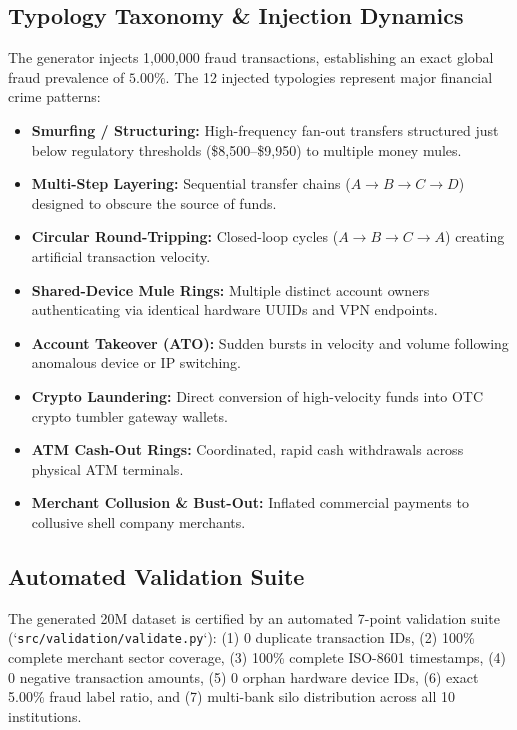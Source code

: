 \subsection{Typology Taxonomy \&  Injection Dynamics}
The generator injects 1,000,000 fraud transactions, establishing an exact global fraud prevalence of $5.00\%$. The 12 injected typologies represent major financial crime patterns:
\begin{itemize}
    \item \textbf{Smurfing / Structuring:} High-frequency fan-out transfers structured just below regulatory thresholds (\$8,500--\$9,950) to multiple money mules.
    \item \textbf{Multi-Step Layering:} Sequential transfer chains ($A \to B \to C \to D$) designed to obscure the source of funds.
    \item \textbf{Circular Round-Tripping:} Closed-loop cycles ($A \to B \to C \to A$) creating artificial transaction velocity.
    \item \textbf{Shared-Device Mule Rings:} Multiple distinct account owners authenticating via identical hardware UUIDs and VPN endpoints.
    \item \textbf{Account Takeover (ATO):} Sudden bursts in velocity and volume following anomalous device or IP switching.
    \item \textbf{Crypto Laundering:} Direct conversion of high-velocity funds into OTC crypto tumbler gateway wallets.
    \item \textbf{ATM Cash-Out Rings:} Coordinated, rapid cash withdrawals across physical ATM terminals.
    \item \textbf{Merchant Collusion & Bust-Out:} Inflated commercial payments to collusive shell company merchants.
\end{itemize}

\subsection{Automated Validation Suite}
The generated 20M dataset is certified by an automated 7-point validation suite (`\texttt{src/validation/validate.py}`): (1) 0 duplicate transaction IDs, (2) 100\% complete merchant sector coverage, (3) 100\% complete ISO-8601 timestamps, (4) 0 negative transaction amounts, (5) 0 orphan hardware device IDs, (6) exact 5.00\% fraud label ratio, and (7) multi-bank silo distribution across all 10 institutions.

